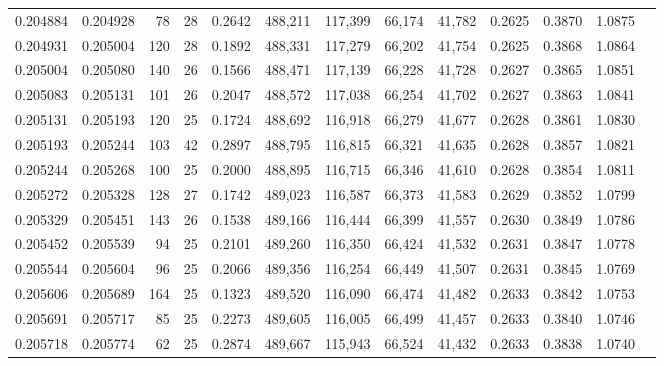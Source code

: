 \begin{tabular}{rrrrrrrrrrrrr}
0.204884 & 0.204928 &  78 &  28 &                                     0.2642 & 488,211 & 117,399 &  66,174 &  41,782 & 0.2625 & 0.3870 & 1.0875 \\
0.204931 & 0.205004 & 120 &  28 &                                     0.1892 & 488,331 & 117,279 &  66,202 &  41,754 & 0.2625 & 0.3868 & 1.0864 \\
0.205004 & 0.205080 & 140 &  26 &                                     0.1566 & 488,471 & 117,139 &  66,228 &  41,728 & 0.2627 & 0.3865 & 1.0851 \\
0.205083 & 0.205131 & 101 &  26 &                                     0.2047 & 488,572 & 117,038 &  66,254 &  41,702 & 0.2627 & 0.3863 & 1.0841 \\
0.205131 & 0.205193 & 120 &  25 &                                     0.1724 & 488,692 & 116,918 &  66,279 &  41,677 & 0.2628 & 0.3861 & 1.0830 \\
0.205193 & 0.205244 & 103 &  42 &                                     0.2897 & 488,795 & 116,815 &  66,321 &  41,635 & 0.2628 & 0.3857 & 1.0821 \\
0.205244 & 0.205268 & 100 &  25 &                                     0.2000 & 488,895 & 116,715 &  66,346 &  41,610 & 0.2628 & 0.3854 & 1.0811 \\
0.205272 & 0.205328 & 128 &  27 &                                     0.1742 & 489,023 & 116,587 &  66,373 &  41,583 & 0.2629 & 0.3852 & 1.0799 \\
0.205329 & 0.205451 & 143 &  26 &                                     0.1538 & 489,166 & 116,444 &  66,399 &  41,557 & 0.2630 & 0.3849 & 1.0786 \\
0.205452 & 0.205539 &  94 &  25 &                                     0.2101 & 489,260 & 116,350 &  66,424 &  41,532 & 0.2631 & 0.3847 & 1.0778 \\
0.205544 & 0.205604 &  96 &  25 &                                     0.2066 & 489,356 & 116,254 &  66,449 &  41,507 & 0.2631 & 0.3845 & 1.0769 \\
0.205606 & 0.205689 & 164 &  25 &                                     0.1323 & 489,520 & 116,090 &  66,474 &  41,482 & 0.2633 & 0.3842 & 1.0753 \\
0.205691 & 0.205717 &  85 &  25 &                                     0.2273 & 489,605 & 116,005 &  66,499 &  41,457 & 0.2633 & 0.3840 & 1.0746 \\
0.205718 & 0.205774 &  62 &  25 &                                     0.2874 & 489,667 & 115,943 &  66,524 &  41,432 & 0.2633 & 0.3838 & 1.0740 \\

\end{tabular}
